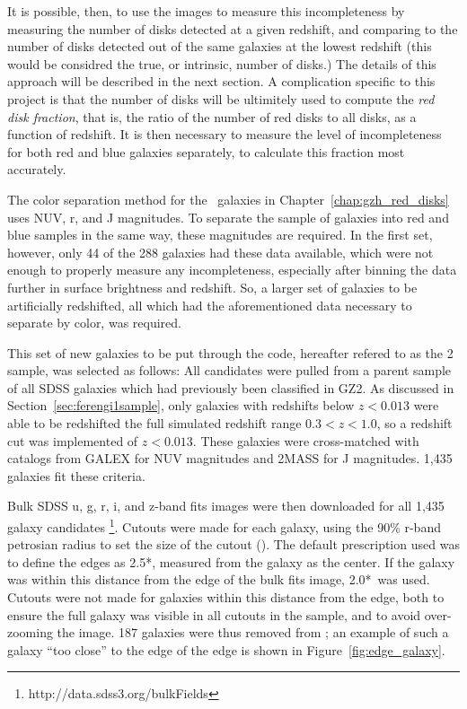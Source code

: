 It is possible, then, to use the \ferengi{} images to measure this incompleteness by measuring the number of disks detected at a given redshift, and comparing to the number of disks detected out of the same galaxies at the lowest redshift (this would be considred the true, or intrinsic, number of disks.) The details of this approach will be described in the next section. A complication specific to this project is that the number of disks will be ultimitely used to compute the \emph{red disk fraction}, that is, the ratio of the number of red disks to all disks, as a function of redshift. It is then necessary to measure the level of incompleteness for both red and blue galaxies separately, to calculate this fraction most accurately.

The color separation method for the \hst~galaxies in Chapter~\ref{chap:gzh_red_disks} uses NUV, r, and J magnitudes. To separate the \ferengi{} sample of galaxies into red and blue samples in the same way, these magnitudes are required. In the first set, however, only 44 of the 288 galaxies had these data available, which were not enough to properly measure any incompleteness, especially after binning the data further in surface brightness and redshift. So, a larger set of galaxies to be artificially redshifted, all which had the aforementioned data necessary to separate by color, was required.

This set of new galaxies to be put through the \ferengi{} code, hereafter refered to as the \ferengi{} 2 sample, was selected as follows: All candidates were pulled from a parent sample of all SDSS galaxies which had previously been classified in GZ2. As discussed in Section~\ref{sec:ferengi1sample}, only galaxies with redshifts below $z<0.013$ were able to be redshifted the full simulated redshift range $0.3<z<1.0$, so a redshift cut was implemented of $z<0.013$. These galaxies were cross-matched with catalogs from GALEX \citep{Martin2005} for NUV magnitudes and 2MASS \citep{Skrutskie2006} for J magnitudes. 1,435 galaxies fit these criteria.  

Bulk SDSS u, g, r, i, and z-band fits images were then downloaded for all 1,435 galaxy candidates \footnote{http://data.sdss3.org/bulkFields}. Cutouts were made for each galaxy, using the 90\% r-band petrosian radius to set the size of the cutout (\radr). The default prescription used was to define the edges as 2.5*\radr, measured from the galaxy as the center. If the galaxy was within this distance from the edge of the bulk fits image, 2.0*\radr~was used. Cutouts were not made for galaxies within this distance from the edge, both to ensure the full galaxy was visible in all cutouts in the sample, and to avoid over-zooming the image. 187 galaxies were thus removed from ; an example of such a galaxy ``too close'' to the edge of the edge is shown in Figure~\ref{fig:edge_galaxy}.  




